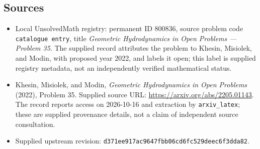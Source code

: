 \documentclass[11pt]{article}
\begin{document}
\subsection{Sources}
\begin{itemize}
\item Local UnsolvedMath registry: permanent ID \(800836\), source problem code \texttt{catalogue entry}, title \emph{Geometric Hydrodynamics in Open Problems --- Problem 35}. The supplied record attributes the problem to Khesin, Misiolek, and Modin, with proposed year 2022, and labels it open; this label is supplied registry metadata, not an independently verified mathematical status.
\item Khesin, Misiolek, and Modin, \emph{Geometric Hydrodynamics in Open Problems} (2022), Problem 35. Supplied source URL: \url{https://arxiv.org/abs/2205.01143}. The record reports access on 2026-10-16 and extraction by \texttt{arxiv\_latex}; these are supplied provenance details, not a claim of independent source consultation.
\item Supplied upstream revision: \texttt{d371ee917ac9647fbb06cd6fc529deec6f3dda82}.
\end{itemize}
\end{document}
